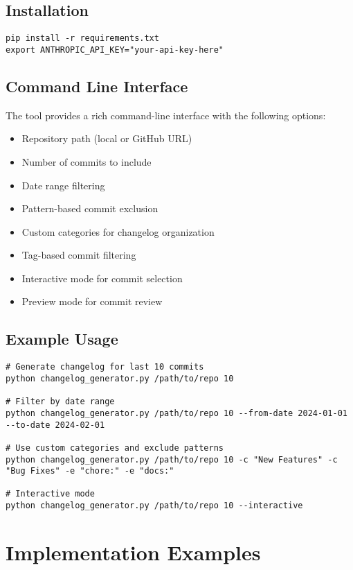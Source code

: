 \documentclass[sigconf]{acmart}
\begin{document}
\subsection{Installation}
\begin{verbatim}
pip install -r requirements.txt
export ANTHROPIC_API_KEY="your-api-key-here"
\end{verbatim}

\subsection{Command Line Interface}
The tool provides a rich command-line interface with the following options:
\begin{itemize}
    \item Repository path (local or GitHub URL)
    \item Number of commits to include
    \item Date range filtering
    \item Pattern-based commit exclusion
    \item Custom categories for changelog organization
    \item Tag-based commit filtering
    \item Interactive mode for commit selection
    \item Preview mode for commit review
\end{itemize}

\subsection{Example Usage}
\begin{verbatim}
# Generate changelog for last 10 commits
python changelog_generator.py /path/to/repo 10

# Filter by date range
python changelog_generator.py /path/to/repo 10 --from-date 2024-01-01 --to-date 2024-02-01

# Use custom categories and exclude patterns
python changelog_generator.py /path/to/repo 10 -c "New Features" -c "Bug Fixes" -e "chore:" -e "docs:"

# Interactive mode
python changelog_generator.py /path/to/repo 10 --interactive
\end{verbatim}

\section{Implementation Examples}
\end{document}
